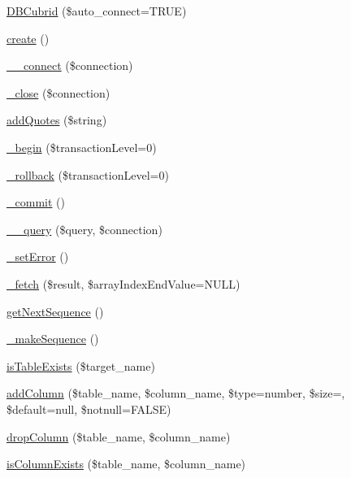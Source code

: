 \begin{DoxyCompactItemize}
\item 
\hyperlink{classDBCubrid_aa3bdbcc2f3c50b224f6e243ca0ed1d69}{D\+B\+Cubrid} (\$auto\+\_\+connect=T\+R\+UE)
\item 
\hyperlink{classDBCubrid_a9a5f425a0abce46d33a6d713b7dd407f}{create} ()
\item 
\hyperlink{classDBCubrid_aa0798dadf20548b2c38e925f391c72f2}{\+\_\+\+\_\+connect} (\$connection)
\item 
\hyperlink{classDBCubrid_ab1a7b718fc864d7b5992cd99abfe2690}{\+\_\+close} (\$connection)
\item 
\hyperlink{classDBCubrid_ab9aea745152a86b3852101aa3225f26d}{add\+Quotes} (\$string)
\item 
\hyperlink{classDBCubrid_a4982cdf2544caf63427258ba5d03ef83}{\+\_\+begin} (\$transaction\+Level=0)
\item 
\hyperlink{classDBCubrid_ac1173f02246bee40975fe2a96973abd0}{\+\_\+rollback} (\$transaction\+Level=0)
\item 
\hyperlink{classDBCubrid_ac8cce69fb6939b2383eb03214ff2522b}{\+\_\+commit} ()
\item 
\hyperlink{classDBCubrid_a2319e8c887147d9596e096088ff67c6a}{\+\_\+\+\_\+query} (\$query, \$connection)
\item 
\hyperlink{classDBCubrid_aaf7dd65f4cdfea9903ab641163058936}{\+\_\+set\+Error} ()
\item 
\hyperlink{classDBCubrid_abb95044521be20a8b2ba105ab623b4d9}{\+\_\+fetch} (\$result, \$array\+Index\+End\+Value=N\+U\+LL)
\item 
\hyperlink{classDBCubrid_a56780e480de62dfca8d67c7bccb4791c}{get\+Next\+Sequence} ()
\item 
\hyperlink{classDBCubrid_ac91bfc1859aaeb1a8d7a58e56829d4de}{\+\_\+make\+Sequence} ()
\item 
\hyperlink{classDBCubrid_aa88914b97476deb6c292a44bff2f2f40}{is\+Table\+Exists} (\$target\+\_\+name)
\item 
\hyperlink{classDBCubrid_aa07f325f6dffa352fa41ea767816e9c1}{add\+Column} (\$table\+\_\+name, \$column\+\_\+name, \$type=\textquotesingle{}number\textquotesingle{}, \$size=\textquotesingle{}\textquotesingle{}, \$default=null, \$notnull=F\+A\+L\+SE)
\item 
\hyperlink{classDBCubrid_ad0b269d73617c6de8b3135ee36ae43d2}{drop\+Column} (\$table\+\_\+name, \$column\+\_\+name)
\item 
\hyperlink{classDBCubrid_a76c8d9dd51a3e64f18b8d1f4da318ac7}{is\+Column\+Exists} (\$table\+\_\+name, \$column\+\_\+name)

\end{DoxyCompactItemize}
